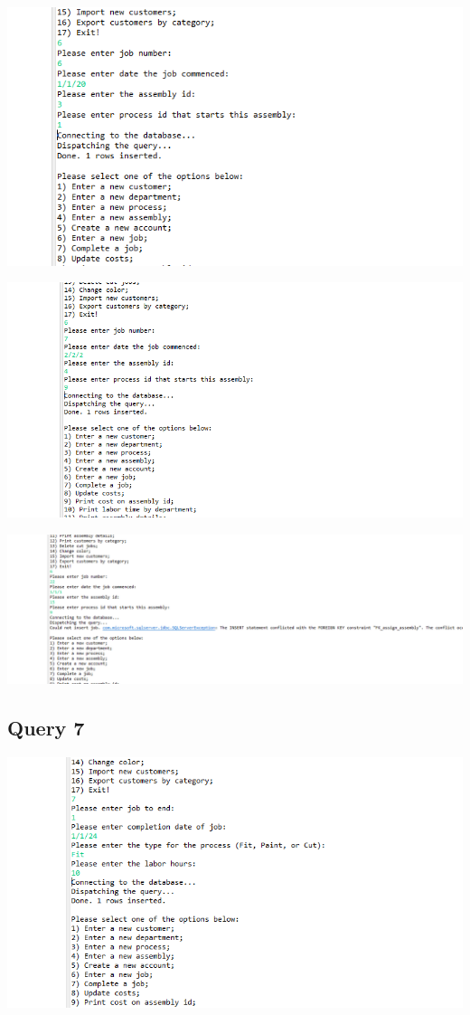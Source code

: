 \documentclass[11pt]{article}
\begin{document}
\includegraphics[width = \textwidth]{job2.png}

\includegraphics[width = \textwidth]{job3.png}

\includegraphics[width = \textwidth]{job4.png}
\subsection{Query 7}
\includegraphics[width = \textwidth]{endJob1.png}
\end{document}
